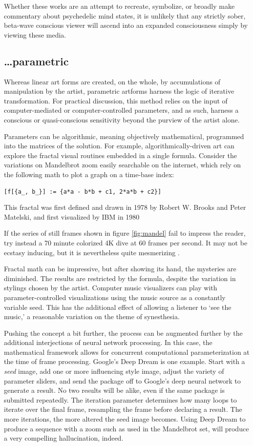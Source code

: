 \documentclass{UIdahoMastersThesis}
\begin{document}
Whether these works are an attempt to recreate, symbolize, or broadly make commentary about psychedelic mind states, it is unlikely that any strictly sober, beta-wave conscious viewer will ascend into an expanded consciousness simply by viewing these media.

\subsection*{\ldots parametric}

Whereas linear art forms are created, on the whole, by accumulations of manipulation by the artist, parametric artforms harness the logic of iterative transformation. For practical discussion, this method relies on the input of computer-mediated or computer-controlled parameters, and as such, harness a conscious or quasi-conscious sensitivity beyond the purview of the artist alone. 

Parameters can be algorithmic, meaning objectively mathematical, programmed into the matrices of the solution. For example, algorithmically-driven art can explore the fractal visual routines embedded in a single formula. Consider the variations on Mandelbrot zoom easily searchable on the internet, which rely on the following math to plot a graph on a time-base index: 

\verb|[f[{a_, b_}] := {a*a - b*b + c1, 2*a*b + c2}]|

This fractal was first defined and drawn in 1978 by Robert W. Brooks and Peter Matelski, and first visualized by IBM in 1980 \cite{taylor2008biophilic}

If the series of still frames shown in figure \ref{fig:mandel} fail to impress the reader, try instead a 70 minute colorized 4K dive at 60 frames per second. It may not be ecstasy inducing, but it is nevertheless quite mesmerizing \cite{noauthor_eye_nodate}.

Fractal math can be impressive, but after showing its hand, the mysteries are diminished. The results are restricted by the formula, despite the variation in stylings chosen by the artist. Computer music visualizers can play with parameter-controlled visualizations using the music source as a constantly variable seed. This has the additional effect of allowing a listener to `see the music,' a reasonable variation on the theme of synesthesia.
 
Pushing the concept a bit further, the process can be augmented further by the additional interjections of neural network processing. In this case, the mathematical framework allows for concurrent computational parameterization at the time of frame processing. Google's Deep Dream is one example. Start with a \emph{seed} image, add one or more influencing style image, adjust the variety of parameter sliders, and send the package off to Google's deep neural network to generate a result. No two results will be alike, even if the same package is submitted repeatedly. The iteration parameter determines how many loops to iterate over the final frame, resampling the frame before declaring a result. The more iterations, the more altered the seed image becomes. Using Deep Dream to produce a sequence with a zoom such as used in the Mandelbrot set, will produce a very compelling hallucination, indeed. 
\end{document}
